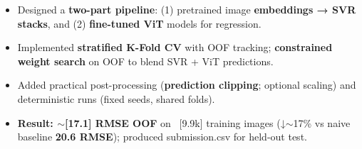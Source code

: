 \documentclass[a4paper,20pt]{article}
\begin{document}
\begin{itemize}\itemsep -2pt
  \item Designed a \textbf{two-part pipeline}: (1) pretrained image \textbf{embeddings → SVR stacks}, and (2) \textbf{fine-tuned ViT} models for regression.
  \item Implemented \textbf{stratified K-Fold CV} with OOF tracking; \textbf{constrained weight search} on OOF to blend SVR + ViT predictions.
  \item Added practical post-processing (\textbf{prediction clipping}; optional scaling) and deterministic runs (fixed seeds, shared folds).
  \item \textbf{Result: $\sim$[17.1] RMSE OOF} on ~[9.9k] training images (↓$\sim$17\% vs naive baseline \textbf{20.6 RMSE}); produced submission.csv for held-out test.
\end{itemize}
\end{document}
